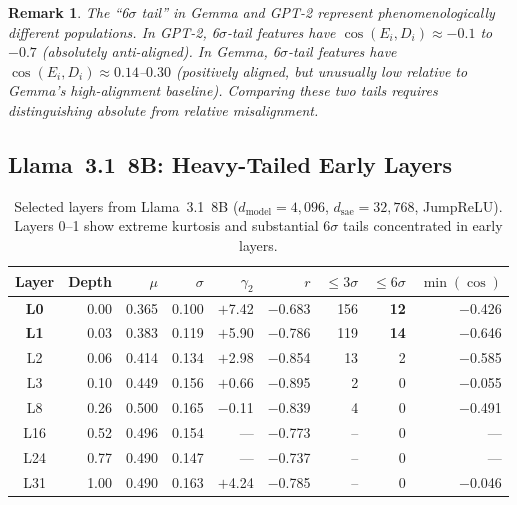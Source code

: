 \documentclass[11pt,a4paper]{article}
\newtheorem{remark}{Remark}
\newcommand{\cosED}{\cos(E_i, D_i)}
\begin{document}
\begin{remark}
The ``6$\sigma$ tail'' in Gemma and GPT-2 represent phenomenologically different populations. In GPT-2, 6$\sigma$-tail features have $\cosED \approx -0.1$ to $-0.7$ (absolutely anti-aligned). In Gemma, 6$\sigma$-tail features have $\cosED \approx 0.14$--$0.30$ (positively aligned, but unusually low relative to Gemma's high-alignment baseline). Comparing these two tails requires distinguishing absolute from relative misalignment.
\end{remark}

\subsection{Llama~3.1~8B: Heavy-Tailed Early Layers}
\label{sec:llama}

\begin{table}[H]
\centering
\caption{Selected layers from Llama~3.1~8B ($d_\text{model}=4{,}096$, $d_\text{sae}=32{,}768$, JumpReLU). Layers 0--1 show extreme kurtosis and substantial $6\sigma$ tails concentrated in early layers.}
\label{tab:llama}
\small
\setlength{\tabcolsep}{4.5pt}
\begin{tabular}{@{}crrrrrrrr@{}}
\toprule
Layer & Depth & $\mu$ & $\sigma$ & $\gamma_2$ & $r$ & ${\leq}3\sigma$ & ${\leq}6\sigma$ & $\min(\cos)$ \\
\midrule
\textbf{L0}  & 0.00 & 0.365 & 0.100 & $+$7.42 & $-$0.683 & 156 & \textbf{12} & $-$0.426 \\
\textbf{L1}  & 0.03 & 0.383 & 0.119 & $+$5.90 & $-$0.786 & 119 & \textbf{14} & $-$0.646 \\
L2  & 0.06 & 0.414 & 0.134 & $+$2.98 & $-$0.854 &  13 & 2 & $-$0.585 \\
L3  & 0.10 & 0.449 & 0.156 & $+$0.66 & $-$0.895 &   2 & 0 & $-$0.055 \\
L8  & 0.26 & 0.500 & 0.165 & $-$0.11 & $-$0.839 &   4 & 0 & $-$0.491 \\
L16 & 0.52 & 0.496 & 0.154 & ---     & $-$0.773 &   -- & 0 & --- \\
L24 & 0.77 & 0.490 & 0.147 & ---     & $-$0.737 &   -- & 0 & --- \\
L31 & 1.00 & 0.490 & 0.163 & $+$4.24 & $-$0.785 &   -- & 0 & $-$0.046 \\
\bottomrule
\end{tabular}
\end{table}
\end{document}
